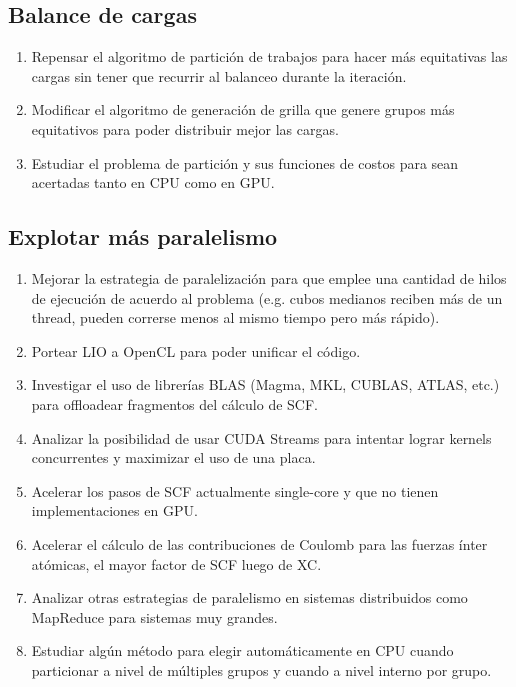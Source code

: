 \subsection{Balance de cargas}
\begin{enumerate}
  \item Repensar el algoritmo de partici\'on de trabajos para hacer m\'as equitativas las cargas sin
    tener que recurrir al balanceo durante la iteraci\'on.
  \item Modificar el algoritmo de generaci\'on de grilla que genere grupos m\'as equitativos para poder
    distribuir mejor las cargas.
  \item Estudiar el problema de partici\'on y sus funciones de costos para sean acertadas tanto en CPU
    como en GPU.
\end{enumerate}

\subsection{Explotar m\'as paralelismo}
\begin{enumerate}
  \item Mejorar la estrategia de paralelizaci\'on para que emplee una cantidad de
  hilos de ejecuci\'on de acuerdo al problema (e.g. cubos medianos reciben m\'as
  de un thread, pueden correrse menos al mismo tiempo pero m\'as r\'apido).
  \item Portear LIO a OpenCL para poder unificar el c\'odigo.
  \item Investigar el uso de librer\'ias BLAS (Magma, MKL, CUBLAS, ATLAS, etc.) para offloadear fragmentos del
    c\'alculo de SCF.
  \item Analizar la posibilidad de usar CUDA Streams para intentar lograr kernels concurrentes y maximizar
    el uso de una placa.
  \item Acelerar los pasos de SCF actualmente single-core y que no tienen implementaciones en GPU.
  \item Acelerar el c\'alculo de las contribuciones de Coulomb para las fuerzas \'inter at\'omicas, el mayor factor de SCF luego de XC.
  \item Analizar otras estrategias de paralelismo en sistemas distribuidos como MapReduce para sistemas muy grandes.
  \item Estudiar alg\'un m\'etodo para elegir autom\'aticamente en CPU cuando particionar a nivel
    de m\'ultiples grupos y cuando a nivel interno por grupo.
\end{enumerate}

